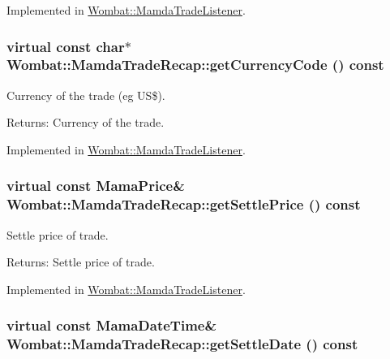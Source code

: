 Implemented in \hyperlink{classWombat_1_1MamdaTradeListener_e51bb722030a31e634fb64cba119cbd1}{Wombat::Mamda\-Trade\-Listener}.\hypertarget{classWombat_1_1MamdaTradeRecap_6587bdc84af742abd6cbb742737cc6db}{
\subsubsection[getCurrencyCode]{\setlength{\rightskip}{0pt plus 5cm}virtual const char$\ast$ Wombat::Mamda\-Trade\-Recap::get\-Currency\-Code () const}}
\label{classWombat_1_1MamdaTradeRecap_6587bdc84af742abd6cbb742737cc6db}


Currency of the trade (eg US\$). 

\begin{Desc}
\item[Returns:]Currency of the trade. \end{Desc}


Implemented in \hyperlink{classWombat_1_1MamdaTradeListener_cbbf27265245059efc55efa1d6db2c0b}{Wombat::Mamda\-Trade\-Listener}.\hypertarget{classWombat_1_1MamdaTradeRecap_859bb4a768932a59460651ade04e4b81}{
\subsubsection[getSettlePrice]{\setlength{\rightskip}{0pt plus 5cm}virtual const Mama\-Price\& Wombat::Mamda\-Trade\-Recap::get\-Settle\-Price () const}}
\label{classWombat_1_1MamdaTradeRecap_859bb4a768932a59460651ade04e4b81}


Settle price of trade. 

\begin{Desc}
\item[Returns:]Settle price of trade. \end{Desc}


Implemented in \hyperlink{classWombat_1_1MamdaTradeListener_f3eda46328eb6e9a02e76ff6f936ecc5}{Wombat::Mamda\-Trade\-Listener}.\hypertarget{classWombat_1_1MamdaTradeRecap_80a2aabb513c40dc4d7d22173077b5db}{
\subsubsection[getSettleDate]{\setlength{\rightskip}{0pt plus 5cm}virtual const Mama\-Date\-Time\& Wombat::Mamda\-Trade\-Recap::get\-Settle\-Date () const}}
\label{classWombat_1_1MamdaTradeRecap_80a2aabb513c40dc4d7d22173077b5db}



